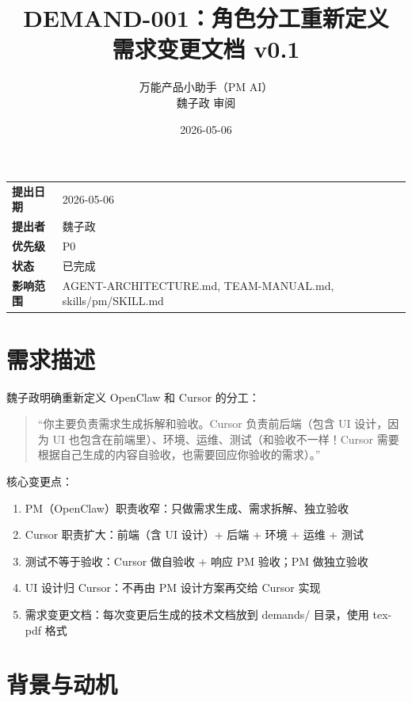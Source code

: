 \documentclass[11pt,a4paper]{article}
\title{\textbf{DEMAND-001：角色分工重新定义}\\[0.5em]\small 需求变更文档 v0.1}
\author{万能产品小助手（PM AI）\\魏子政 审阅}
\date{2026-05-06}
\begin{document}
\maketitle

\begin{center}
\begin{tabular}{ll}
\toprule
\textbf{提出日期} & 2026-05-06 \\
\textbf{提出者} & 魏子政 \\
\textbf{优先级} & \textcolor{danger}{P0} \\
\textbf{状态} & \textcolor{success}{已完成} \\
\textbf{影响范围} & AGENT-ARCHITECTURE.md, TEAM-MANUAL.md, skills/pm/SKILL.md \\
\bottomrule
\end{tabular}
\end{center}

\vspace{1em}

\section{需求描述}

魏子政明确重新定义 OpenClaw 和 Cursor 的分工：

\begin{quote}
``你主要负责需求生成拆解和验收。Cursor 负责前后端（包含 UI 设计，因为 UI 也包含在前端里）、环境、运维、测试（和验收不一样！Cursor 需要根据自己生成的内容自验收，也需要回应你验收的需求）。''
\end{quote}

核心变更点：
\begin{enumerate}
  \item PM（OpenClaw）职责收窄：只做需求生成、需求拆解、独立验收
  \item Cursor 职责扩大：前端（含 UI 设计）+ 后端 + 环境 + 运维 + 测试
  \item 测试不等于验收：Cursor 做自验收 + 响应 PM 验收；PM 做独立验收
  \item UI 设计归 Cursor：不再由 PM 设计方案再交给 Cursor 实现
  \item 需求变更文档：每次变更后生成的技术文档放到 demands/ 目录，使用 tex-pdf 格式
\end{enumerate}

\section{背景与动机}
\end{document}
